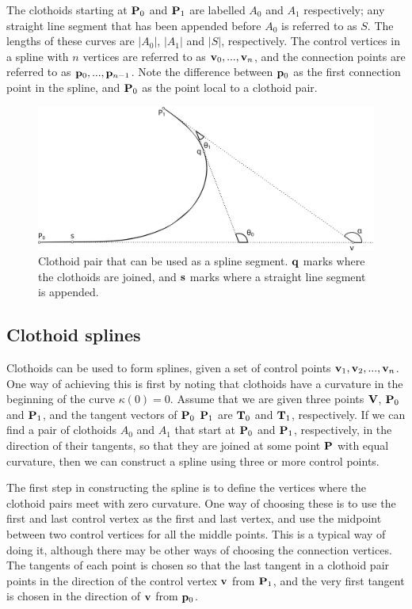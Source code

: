 The clothoids starting at ${\mathbf P}_0$ and ${\mathbf P}_1$ are labelled $A_0$ and $A_1$ respectively; any straight line segment that has been appended before $A_0$ is referred to as $S$. The lengths of these curves are $|A_0|$, $|A_1|$ and $|S|$, respectively. The control vertices in a spline with $n$ vertices are referred to as ${\mathbf v}_0, ..., {\mathbf v}_n$, and the connection points are referred to as ${\mathbf p}_0, ..., {\mathbf p}_{n-1}$. Note the difference between ${\mathbf p}_0$ as the first connection point in the spline, and ${\mathbf P}_0$ as the point local to a clothoid pair.

\begin{figure}[ht]
\centering
\includegraphics[width=\textwidth]{figure/clothoid_pair}
\caption{Clothoid pair that can be used as a spline segment. $\mathbf{q}$ marks where the clothoids are joined, and $\mathbf{s}$ marks where a straight line segment is appended.}
\label{fig:clothoid_pair}
\end{figure}

\subsection{Clothoid splines}
\label{sec:clothoid_spline}
Clothoids can be used to form splines, given a set of control points $\mathbf{v}_1, \mathbf{v}_2, ..., \mathbf{v}_n$.\cite{clothoid} One way of achieving this is first by noting that clothoids have a curvature in the beginning of the curve $\kappa(0) = 0$. Assume that we are given three points $\mathbf{V}$, $\mathbf{P}_0$ and $\mathbf{P}_1$, and the tangent vectors of ${\mathbf P}_0$ ${\mathbf P}_1$ are ${\mathbf T}_0$ and ${\mathbf T}_1$, respectively. If we can find a pair of clothoids $A_0$ and $A_1$ that start at $\mathbf{P}_0$ and $\mathbf{P}_1$, respectively, in the direction of their tangents, so that they are joined at some point $\mathbf{P}$ with equal curvature, then we can construct a spline using three or more control points.\cite{clothoid} 

The first step in constructing the spline is to define the vertices where the clothoid pairs meet with zero curvature. One way of choosing these is to use the first and last control vertex as the first and last vertex, and use the midpoint between two control vertices for all the middle points. This is a typical way of doing it, although there may be other ways of choosing the connection vertices. The tangents of each point is chosen so that the last tangent in a clothoid pair points in the direction of the control vertex $\mathbf{v}$ from $\mathbf{P}_1$, and the very first tangent is chosen in the direction of $\mathbf{v}$ from $\mathbf{p}_0$. 

